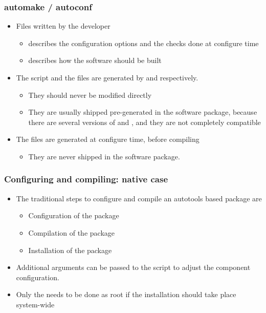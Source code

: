 \begin{frame}
  \frametitle{automake / autoconf}
  \begin{itemize}
  \item Files written by the developer
    \begin{itemize}
    \item {} describes the configuration options and
      the checks done at configure time
    \item {} describes how the software should be
      built
    \end{itemize}
  \item The  script and the  files
    are generated by  and  respectively.
    \begin{itemize}
    \item They should never be modified directly
    \item They are usually shipped pre-generated in the software
      package, because there are several versions of 
      and , and they are not completely compatible
    \end{itemize}
  \item The  files are generated at configure time, before
    compiling
    \begin{itemize}
    \item They are never shipped in the software package.
    \end{itemize}
  \end{itemize}
\end{frame}

\begin{frame}
  \frametitle{Configuring and compiling: native case}
  \begin{itemize}
  \item The traditional steps to configure and compile an autotools
    based package are
    \begin{itemize}
    \item Configuration of the package\\
    \item Compilation of the package\\
    \item Installation of the package\\
    \end{itemize}
  \item Additional arguments can be passed to the 
    script to adjust the component configuration.
  \item Only the  needs to be done as root if the
    installation should take place system-wide
  \end{itemize}
\end{frame}

